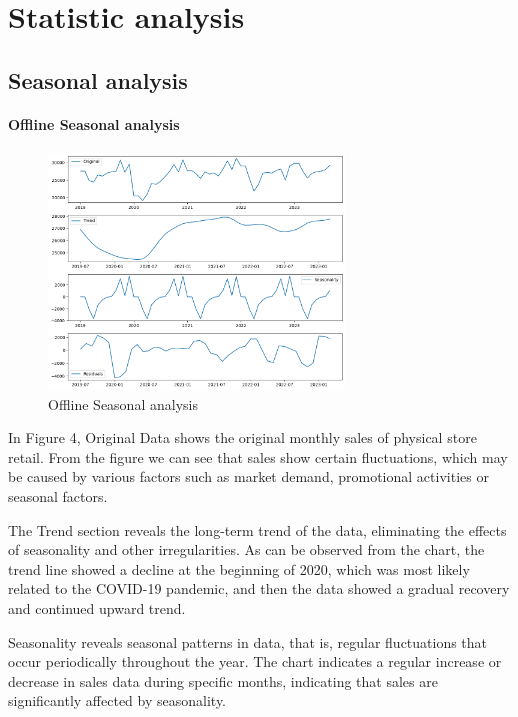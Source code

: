 \documentclass{article}
\begin{document}
\section{Statistic analysis}
\subsection{Seasonal analysis}
\paragraph{Offline Seasonal analysis}
\begin{figure}[h]
  \centering
  \includegraphics[width=0.7\textwidth]{Seasonal_analysis_offline.png}
  \caption{Offline Seasonal analysis}
  \label{fig:yourlabel}
\end{figure}

In Figure 4, Original Data shows the original monthly sales of physical store retail. From the figure we can see that sales show certain fluctuations, which may be caused by various factors such as market demand, promotional activities or seasonal factors.

The Trend section reveals the long-term trend of the data, eliminating the effects of seasonality and other irregularities. As can be observed from the chart, the trend line showed a decline at the beginning of 2020, which was most likely related to the COVID-19 pandemic, and then the data showed a gradual recovery and continued upward trend.

Seasonality reveals seasonal patterns in data, that is, regular fluctuations that occur periodically throughout the year. The chart indicates a regular increase or decrease in sales data during specific months, indicating that sales are significantly affected by seasonality.
\end{document}
